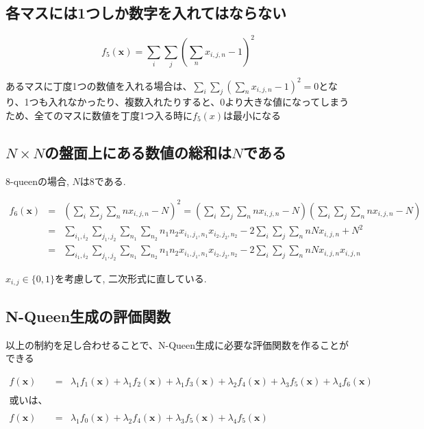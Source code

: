 \documentclass[uplatex,dvipdfmx,a4paper,11pt,oneside,openany]{jsbook}
\begin{document}
\subsection{各マスには1つしか数字を入れてはならない}

\[
f_5(\bm{x})=\sum_i\sum_j\left(\sum_n x_{i,j,n} - 1\right)^2
\]

あるマスに丁度1つの数値を入れる場合は、$\sum_i\sum_j\left(\sum_n x_{i,j,n} - 1\right)^2=0$となり、1つも入れなかったり、複数入れたりすると、0より大きな値になってしまうため、全てのマスに数値を丁度1つ入る時に$f_5(x)$は最小になる

\subsection{$N\times N$の盤面上にある数値の総和は$N$である}

8-queenの場合, $N$は$8$である.

\begin{eqnarray*}
f_6(\bm{x})&=&\left(\sum_i\sum_j\sum_n n x_{i,j,n} - N\right)^2=\left(\sum_i\sum_j\sum_n n x_{i,j,n} - N\right)\left(\sum_i\sum_j\sum_n n x_{i,j,n} - N\right)\\
&=&\sum_{i_1,i_2}\sum_{j_1,j_2}\sum_{n_1}\sum_{n_2}n_1 n_2 x_{i_1,j_1,n_1}x_{i_2,j_2,n_2}-2\sum_i\sum_j\sum_n n N x_{i,j,n} + N^2\\
&=&\sum_{i_1,i_2}\sum_{j_1,j_2}\sum_{n_1}\sum_{n_2}n_1 n_2 x_{i_1,j_1,n_1}x_{i_2,j_2,n_2} -2\sum_i\sum_j\sum_n n N x_{i,j,n}x_{i,j,n}
\end{eqnarray*}

$x_{i,j}\in \{0,1\}$を考慮して, 二次形式に直している.

\subsection{N-Queen生成の評価関数}

以上の制約を足し合わせることで、N-Queen生成に必要な評価関数を作ることができる

\begin{eqnarray*}
  f(\bm{x}) &=& \lambda_1 f_1(\bm{x}) + \lambda_1 f_2(\bm{x}) + \lambda_1 f_3(\bm{x}) + \lambda_2 f_4(\bm{x}) + \lambda_3 f_5(\bm{x})+ \lambda_4 f_6(\bm{x})\\
  \\或いは、\\\\
  f(\bm{x}) &=& \lambda_1 f_0(\bm{x}) + \lambda_2 f_4(\bm{x}) + \lambda_3 f_5(\bm{x}) + \lambda_4 f_5(\bm{x})
\end{eqnarray*}
\end{document}
